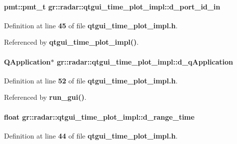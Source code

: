 \paragraph[{d\+\_\+port\+\_\+id\+\_\+in}]{\setlength{\rightskip}{0pt plus 5cm}pmt\+::pmt\+\_\+t gr\+::radar\+::qtgui\+\_\+time\+\_\+plot\+\_\+impl\+::d\+\_\+port\+\_\+id\+\_\+in}\label{classgr_1_1radar_1_1qtgui__time__plot__impl_acc8346c5d6c19a319ab0253fa27142e3}


Definition at line {\bf 45} of file {\bf qtgui\+\_\+time\+\_\+plot\+\_\+impl.\+h}.



Referenced by {\bf qtgui\+\_\+time\+\_\+plot\+\_\+impl()}.

\paragraph[{d\+\_\+q\+Application}]{\setlength{\rightskip}{0pt plus 5cm}Q\+Application$\ast$ gr\+::radar\+::qtgui\+\_\+time\+\_\+plot\+\_\+impl\+::d\+\_\+q\+Application}\label{classgr_1_1radar_1_1qtgui__time__plot__impl_a51200768de18c137d4c267991b893ac1}


Definition at line {\bf 52} of file {\bf qtgui\+\_\+time\+\_\+plot\+\_\+impl.\+h}.



Referenced by {\bf run\+\_\+gui()}.

\paragraph[{d\+\_\+range\+\_\+time}]{\setlength{\rightskip}{0pt plus 5cm}float gr\+::radar\+::qtgui\+\_\+time\+\_\+plot\+\_\+impl\+::d\+\_\+range\+\_\+time}\label{classgr_1_1radar_1_1qtgui__time__plot__impl_ab87734d6c88462b173521433576c2ac0}


Definition at line {\bf 44} of file {\bf qtgui\+\_\+time\+\_\+plot\+\_\+impl.\+h}.




